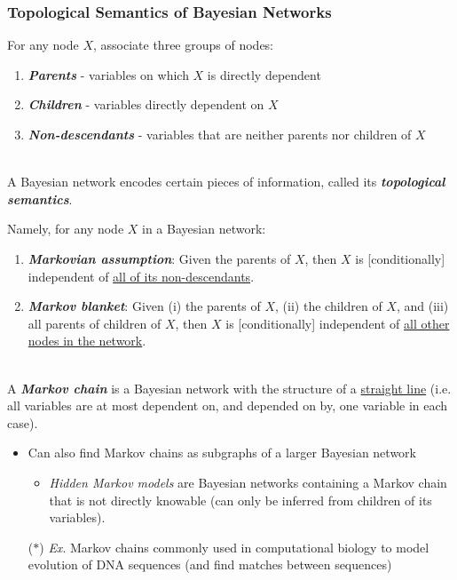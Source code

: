 \documentclass[12pt]{extarticle}
\theoremstyle{definition}
\theoremstyle{remark}
\newcommand{\pstart}[0]{\noindent}
\newcommand{\newp}[0]{~\\ \pstart}
\newcommand{\term}[1]{\noindent\textbf{\textit{#1}}}
\begin{document}
\subsubsection{Topological Semantics of Bayesian Networks}
\pstart
For any node $X$, associate three groups of nodes: \begin{enumerate}
    \item \term{Parents} - variables on which $X$ is directly dependent
    \item \term{Children} - variables directly dependent on $X$
    \item \term{Non-descendants} - variables that are neither parents nor children of $X$
\end{enumerate}

\newp
A Bayesian network encodes certain pieces of information, called its \term{topological semantics}.

\vspace{4pt}\pstart
Namely, for any node $X$ in a Bayesian network:
\begin{enumerate}
    \item \term{Markovian assumption}: Given the parents of $X$, then $X$ is [conditionally] independent of \ul{all of its non-descendants}.
    \item \term{Markov blanket}: Given (i) the parents of $X$, (ii) the children of $X$, and (iii) all parents of children of $X$, then $X$ is [conditionally] independent of \ul{all other nodes in the network}.
\end{enumerate}

\newp
A \term{Markov chain} is a Bayesian network with the structure of a \ul{straight line} (i.e. all variables are at most dependent on, and depended on by, one variable in each case). \begin{itemize}
    \item Can also find Markov chains as subgraphs of a larger Bayesian network \begin{itemize}
        \item \textit{Hidden Markov models} are Bayesian networks containing a Markov chain that is not directly knowable (can only be inferred from children of its variables).
    \end{itemize}
    \item[($\ast$)] \textit{Ex}. Markov chains commonly used in computational biology to model evolution of DNA sequences (and find matches between sequences)
\end{itemize}
\end{document}
